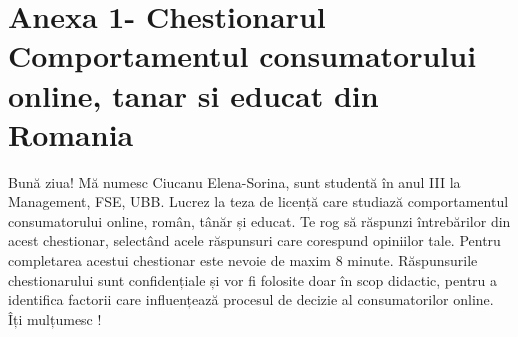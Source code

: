 \documentclass[a4paper, 12pt]{article}
\begin{document}
	\section*{Anexa 1- Chestionarul Comportamentul consumatorului online, tanar si educat din Romania }	
	\quad Bună ziua! Mă numesc Ciucanu Elena-Sorina, sunt studentă în anul III la Management, FSE, UBB. Lucrez la teza de licență care studiază comportamentul consumatorului online, român, tânăr și educat. Te rog să răspunzi întrebărilor din acest chestionar, selectând acele răspunsuri care corespund opiniilor tale. Pentru completarea acestui chestionar este nevoie de maxim 8 minute. Răspunsurile chestionarului sunt confidențiale și vor fi folosite doar în scop didactic, pentru a identifica factorii care influențează procesul de decizie al consumatorilor online. Îți mulțumesc !
\newline
\end{document}

